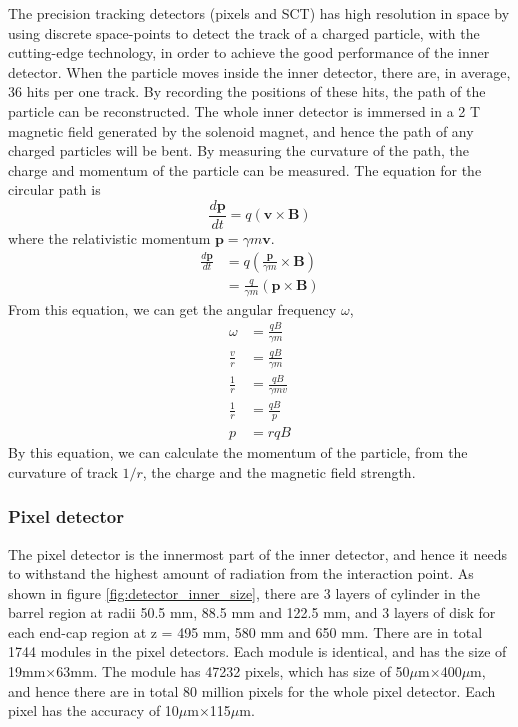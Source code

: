 The precision tracking detectors (pixels and SCT) has high resolution in space by using discrete space-points to detect the track of a charged particle, with the cutting-edge technology, in order to achieve the good performance of the inner detector.
When the particle moves inside the inner detector, there are, in average, 36 hits per one track.
By recording the positions of these hits, the path of the particle can be reconstructed.
The whole inner detector is immersed in a 2 T magnetic field generated by the solenoid magnet, and hence the path of any charged particles will be bent.
By measuring the curvature of the path, the charge and momentum of the particle can be measured.
The equation for the circular path is
\begin{equation}
\frac{d\mathbf{p}}{dt} = q(\mathbf{v} \times \mathbf{B})
\end{equation}
where the relativistic momentum $\mathbf{p} = \gamma m \mathbf{v}$.
\begin{align}
\frac{d\mathbf{p}}{dt} &= q( \frac{\mathbf{p}}{\gamma m} \times \mathbf{B}) \\
&= \frac{q}{\gamma m} (\mathbf{p} \times \mathbf{B})
\end{align}
From this equation, we can get the angular frequency $\omega$,
\begin{align}
\omega &= \frac{qB}{\gamma m} \\
\frac{v}{r} &= \frac{qB}{\gamma m} \\
\frac{1}{r} &= \frac{qB}{\gamma m v} \\
\frac{1}{r} &= \frac{qB}{p} \\
p &= rqB
\end{align}
By this equation, we can calculate the momentum of the particle, from the curvature of track $1/r$, the charge and the magnetic field strength.

\subsubsection{Pixel detector}
The pixel detector is the innermost part of the inner detector, and hence it needs to withstand the highest amount of radiation from the interaction point.
As shown in figure \ref{fig:detector_inner_size}, there are 3 layers of cylinder in the barrel region at radii 50.5 mm, 88.5 mm and 122.5 mm, and 3 layers of disk for each end-cap region at z = 495 mm, 580 mm and 650 mm.
There are in total 1744 modules in the pixel detectors.
Each module is identical, and has the size of 19mm$\times$63mm.
The module has 47232 pixels, which has size of 50$\mu$m$\times$400$\mu$m, and hence there are in total 80 million pixels for the whole pixel detector.
Each pixel has the accuracy of 10$\mu$m$\times$115$\mu$m.

